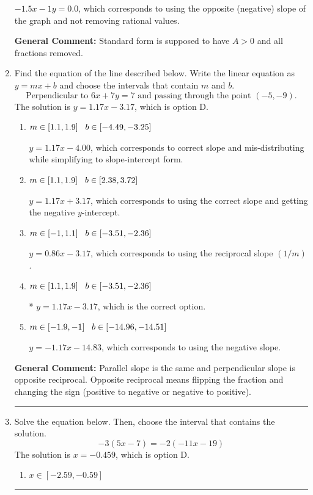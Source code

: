 \documentclass{extbook}[14pt]
\newcommand{\litem}[1]{\item #1

\rule{\textwidth}{0.4pt}}
\begin{document}
\begin{enumerate}
{\begin{enumerate}[label=\Alph*.]
 $-1.5x - 1y = 0.0$, which corresponds to using the opposite (negative) slope of the graph and not removing rational values.
\end{enumerate}

\textbf{General Comment:} Standard form is supposed to have $A > 0$ and all fractions removed.
}
\litem{
Find the equation of the line described below. Write the linear equation as $ y=mx+b $ and choose the intervals that contain $m$ and $b$.
\[ \text{Perpendicular to } 6 x + 7 y = 7 \text{ and passing through the point } (-5, -9). \]The solution is \( y = 1.17x - 3.17 \), which is option D.\begin{enumerate}[label=\Alph*.]
\item \( m \in [1.1, 1.9] \hspace*{3mm} b \in [-4.49, -3.25] \)

 $y = 1.17x - 4.00$, which corresponds to correct slope and mis-distributing while simplifying to slope-intercept form.
\item \( m \in [1.1, 1.9] \hspace*{3mm} b \in [2.38, 3.72] \)

 $y = 1.17x + 3.17$, which corresponds to using the correct slope and getting the negative $y$-intercept.
\item \( m \in [-1, 1.1] \hspace*{3mm} b \in [-3.51, -2.36] \)

 $y = 0.86x - 3.17$, which corresponds to using the reciprocal slope $(1/m)$.
\item \( m \in [1.1, 1.9] \hspace*{3mm} b \in [-3.51, -2.36] \)

* $y = 1.17x - 3.17$, which is the correct option.
\item \( m \in [-1.9, -1] \hspace*{3mm} b \in [-14.96, -14.51] \)

 $y = -1.17x - 14.83$, which corresponds to using the negative slope.
\end{enumerate}

\textbf{General Comment:} Parallel slope is the same and perpendicular slope is opposite reciprocal. Opposite reciprocal means flipping the fraction and changing the sign (positive to negative or negative to positive).
}
\litem{
Solve the equation below. Then, choose the interval that contains the solution.
\[ -3(5x -7) = -2(-11x -19) \]The solution is \( x = -0.459 \), which is option D.\begin{enumerate}[label=\Alph*.]
\item \( x \in [-2.59, -0.59] \)


\end{enumerate}}
\end{enumerate}
\end{document}
